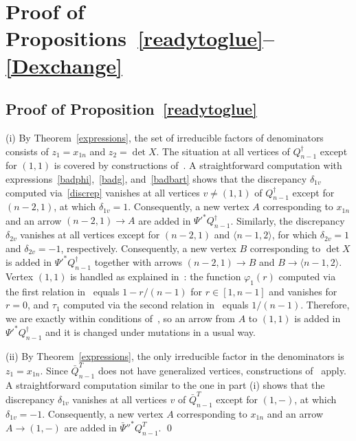 \documentclass{amsart}
\theoremstyle{definition}
\theoremstyle{remark}
\numberwithin{equation}{section}
\numberwithin{theorem}{section}
\def\fy{\varphi}
\begin{document}
\section{Proof of Propositions~\ref{readytoglue}--\ref{Dexchange}}
\subsection{Proof of Proposition~\ref{readytoglue}}  (i) By Theorem~\ref{expressions}, the set of irreducible factors of denominators consists of
$z_1=x_{1n}$ and $z_2=\det X$. 
The situation at all vertices of $Q_{n-1}^\dag$ except for $(1,1)$  is covered by constructions 
of~\cite[Section~4.1 and Remark~4.8]{GSVpullback}. A straightforward computation with expressions~\eqref{badphi},~\eqref{badg}, 
and~\eqref{badbart} shows that the discrepancy $\delta_{1v}$ computed via~\eqref{discrep} vanishes at all vertices $v\ne(1,1)$ of $Q_{n-1}^\dag$ except for $(n-2,1)$, at which $\delta_{1v}=1$.
Consequently, a new vertex $A$ corresponding to $x_{1n}$ and an arrow $(n-2,1)\to A$ are added in $\Psi'^*Q_{n-1}^\dag$. 
Similarly, the discrepancy $\delta_{2v}$ vanishes at all vertices except for $(n-2,1)$ and $\langle n-1,2\rangle$, for which
$\delta_{2v}=1$ and $\delta_{2v}=-1$, respectively. Consequently, a new vertex $B$ corresponding to $\det X$ is added in 
$\Psi'^*Q_{n-1}^\dag$ together with arrows $(n-2,1)\to B$ and 
$B\to \langle n-1,2\rangle$. 
Vertex $(1,1)$ is handled as explained in~\cite[Section~4.4]{GSVpullback}: the function $\fy_1(r)$ computed  
via the first relation in~\cite[Eq.~(4.5)]{GSVpullback} equals $1-r/(n-1)$ for $r\in[1,n-1]$ and vanishes for $r=0$, and 
$\tau_1$ computed via the second relation in~\cite[Eq.~(4.5)]{GSVpullback} equals $1/(n-1)$. Therefore, we are exactly within
conditions of~\cite[Example~4.7(i)]{GSVpullback}, so an arrow from $A$ to $(1,1)$ is added in $\Psi'^*Q_{n-1}^\dag$ and it is changed under mutations in a usual way.

(ii) By Theorem~\ref{expressions}, the only irreducible factor in the denominators is $z_1=x_{1n}$. 
Since $\bar Q_{n-1}^T$ does not have generalized vertices, constructions of~\cite[Section~4.1]{GSVpullback} apply. A straightforward computation similar to the one in part (i) shows that the discrepancy $\delta_{1v}$ vanishes at all vertices 
$v$ of $\bar Q_{n-1}^T$ except for $(1,-)$, at which $\delta_{1v}=-1$. Consequently, a new vertex $A$ corresponding to $x_{1n}$ and an arrow $A\to (1,-)$ are added in 
$\bar \Psi''^*Q_{n-1}^T$. \qed
\end{document}
